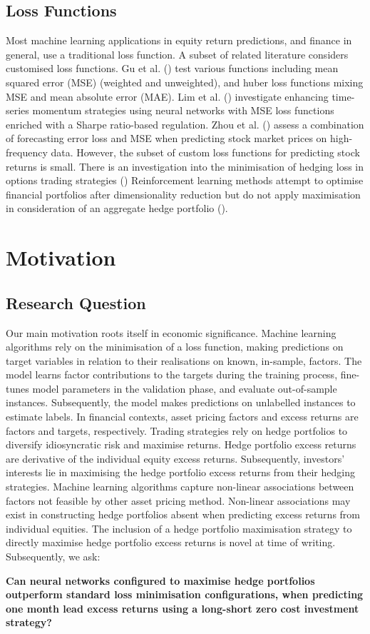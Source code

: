 \documentclass[12pt]{article}
\begin{document}
\subsection{Loss Functions}
Most machine learning applications in equity return predictions, and finance in general, use a traditional loss function.
A subset of related literature considers customised loss functions.
Gu et al. (\citeyear{eapvml}) test various functions including mean squared error (MSE) (weighted and unweighted), and huber loss functions mixing MSE and mean absolute error (MAE).
Lim et al. (\citeyear{lim2019enhancing}) investigate enhancing time-series momentum strategies using neural networks with MSE loss functions enriched with a Sharpe ratio-based regulation.
Zhou et al. (\citeyear{zhou2018stock}) assess a combination of forecasting error loss and MSE when predicting stock market prices on high-frequency data.
However, the subset of custom loss functions for predicting stock returns is small.
There is an investigation into the minimisation of hedging loss in options trading strategies (\cite{ruf2021hedging})
Reinforcement learning methods attempt to optimise financial portfolios after dimensionality reduction but do not apply maximisation in consideration of an aggregate hedge portfolio (\cite{soleymani2020financial}).
\section{Motivation}\label{motivations}
\subsection{Research Question}
Our main motivation roots itself in economic significance.
Machine learning algorithms rely on the minimisation of a loss function, making predictions on target variables in relation to their realisations on known, in-sample, factors. 
The model learns factor contributions to the targets during the training process, fine-tunes model parameters in the validation phase, and evaluate out-of-sample instances.
Subsequently, the model makes predictions on unlabelled instances to estimate labels.
In financial contexts, asset pricing factors and excess returns are factors and targets, respectively.
Trading strategies rely on hedge portfolios to diversify idiosyncratic risk and maximise returns.
Hedge portfolio excess returns are derivative of the individual equity excess returns.
Subsequently, investors' interests lie in maximising the hedge portfolio excess returns from their hedging strategies.
Machine learning algorithms capture non-linear associations between factors not feasible by other asset pricing method.
Non-linear associations may exist in constructing hedge portfolios absent when predicting excess returns from individual equities.
The inclusion of a hedge portfolio maximisation strategy to directly maximise hedge portfolio excess returns is novel at time of writing.
Subsequently, we ask:
\begin{center}
	\textbf{Can neural networks configured to maximise hedge portfolios outperform standard loss minimisation configurations,
	when predicting one month lead excess returns using a long-short zero cost investment strategy?}
\end{center}
\end{document}
